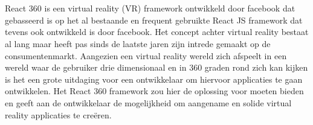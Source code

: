 
%
%

%



\chapter*{}

React 360 is een virtual reality (VR) framework ontwikkeld door facebook dat gebasseerd is op het al bestaande en frequent gebruikte React JS framework dat tevens ook ontwikkeld is door facebook. Het concept achter virtual reality bestaat al lang maar heeft pas sinds de laatste jaren zijn intrede gemaakt op de consumentenmarkt. Aangezien een virtual reality wereld zich afspeelt in een wereld waar de gebruiker drie dimensionaal en in 360 graden rond zich kan kijken is het een grote uitdaging voor een ontwikkelaar om hiervoor applicaties te gaan ontwikkelen. Het React 360 framework zou hier de oplossing voor moeten bieden en geeft aan de ontwikkelaar de mogelijkheid om aangename en solide virtual reality applicaties te creëren.

